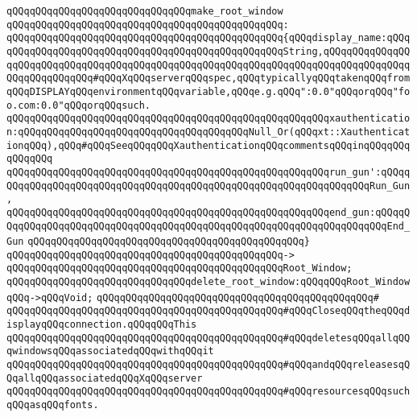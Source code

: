 \newline
\verb|qQQqqQQqqQQqqQQqqQQqqQQqqQQqqQQqmake_root_window|\newline
\verb|qQQqqQQqqQQqqQQqqQQqqQQqqQQqqQQqqQQqqQQqqQQqqQQq:|\newline
\verb|qQQqqQQqqQQqqQQqqQQqqQQqqQQqqQQqqQQqqQQqqQQqqQQq{qQQqdisplay_name:qQQqqQQqqQQqqQQqqQQqqQQqqQQqqQQqqQQqqQQqqQQqqQQqqQQqString,qQQqqQQqqQQqqQQqqQQqqQQqqQQqqQQqqQQqqQQqqQQqqQQqqQQqqQQqqQQqqQQqqQQqqQQqqQQqqQQqqQQqqQQqqQQqqQQqqQQq#qQQqXqQQqserverqQQqspec,qQQqtypicallyqQQqtakenqQQqfromqQQqDISPLAYqQQqenvironmentqQQqvariable,qQQqe.g.qQQq":0.0"qQQqorqQQq"foo.com:0.0"qQQqorqQQqsuch.|\newline
\verb|qQQqqQQqqQQqqQQqqQQqqQQqqQQqqQQqqQQqqQQqqQQqqQQqqQQqqQQqxauthentication:qQQqqQQqqQQqqQQqqQQqqQQqqQQqqQQqqQQqqQQqNull_Or(qQQqxt::XauthenticationqQQq),qQQq#qQQqSeeqQQqqQQqXauthenticationqQQqcommentsqQQqinqQQqqQQqqQQqqQQq|\newline
\verb|qQQqqQQqqQQqqQQqqQQqqQQqqQQqqQQqqQQqqQQqqQQqqQQqqQQqqQQqrun_gun':qQQqqQQqqQQqqQQqqQQqqQQqqQQqqQQqqQQqqQQqqQQqqQQqqQQqqQQqqQQqqQQqqQQqRun_Gun,|\newline
\verb|qQQqqQQqqQQqqQQqqQQqqQQqqQQqqQQqqQQqqQQqqQQqqQQqqQQqqQQqend_gun:qQQqqQQqqQQqqQQqqQQqqQQqqQQqqQQqqQQqqQQqqQQqqQQqqQQqqQQqqQQqqQQqqQQqqQQqEnd_Gun|\newline
\verb|qQQqqQQqqQQqqQQqqQQqqQQqqQQqqQQqqQQqqQQqqQQqqQQq}|\newline
\verb|qQQqqQQqqQQqqQQqqQQqqQQqqQQqqQQqqQQqqQQqqQQqqQQq->|\newline
\verb|qQQqqQQqqQQqqQQqqQQqqQQqqQQqqQQqqQQqqQQqqQQqqQQqRoot_Window;|\newline
\newline
\verb|qQQqqQQqqQQqqQQqqQQqqQQqqQQqqQQqdelete_root_window:qQQqqQQqRoot_WindowqQQq->qQQqVoid;|\newline
\verb|qQQqqQQqqQQqqQQqqQQqqQQqqQQqqQQqqQQqqQQqqQQqqQQq#|\newline
\verb|qQQqqQQqqQQqqQQqqQQqqQQqqQQqqQQqqQQqqQQqqQQqqQQq#qQQqCloseqQQqtheqQQqdisplayqQQqconnection.qQQqqQQqThis|\newline
\verb|qQQqqQQqqQQqqQQqqQQqqQQqqQQqqQQqqQQqqQQqqQQqqQQq#qQQqdeletesqQQqallqQQqwindowsqQQqassociatedqQQqwithqQQqit|\newline
\verb|qQQqqQQqqQQqqQQqqQQqqQQqqQQqqQQqqQQqqQQqqQQqqQQq#qQQqandqQQqreleasesqQQqallqQQqassociatedqQQqXqQQqserver|\newline
\verb|qQQqqQQqqQQqqQQqqQQqqQQqqQQqqQQqqQQqqQQqqQQqqQQq#qQQqresourcesqQQqsuchqQQqasqQQqfonts.|\newline
